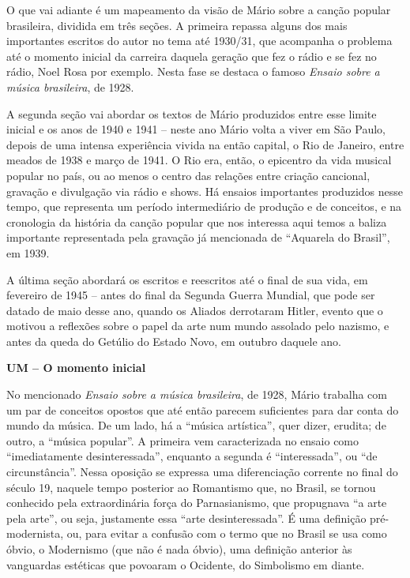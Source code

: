 O que vai adiante é um mapeamento da visão de Mário sobre a canção
popular brasileira, dividida em três seções. A primeira repassa alguns
dos mais importantes escritos do autor no tema até 1930/31, que
acompanha o problema até o momento inicial da carreira daquela geração
que fez o rádio e se fez no rádio, Noel Rosa por exemplo. Nesta fase se
destaca o famoso \emph{Ensaio sobre a música brasileira}, de 1928.

A segunda seção vai abordar os textos de Mário produzidos entre esse
limite inicial e os anos de 1940 e 1941 -- neste ano Mário volta a viver
em São Paulo, depois de uma intensa experiência vivida na então capital,
o Rio de Janeiro, entre meados de 1938 e março de 1941. O Rio era,
então, o epicentro da vida musical popular no país, ou ao menos o centro
das relações entre criação cancional, gravação e divulgação via rádio e
shows. Há ensaios importantes produzidos nesse tempo, que representa um
período intermediário de produção e de conceitos, e na cronologia da
história da canção popular que nos interessa aqui temos a baliza
importante representada pela gravação já mencionada de ``Aquarela do
Brasil'', em 1939.

A última seção abordará os escritos e reescritos até o final de sua
vida, em fevereiro de 1945 -- antes do final da Segunda Guerra Mundial,
que pode ser datado de maio desse ano, quando os Aliados derrotaram
Hitler, evento que o motivou a reflexões sobre o papel da arte num mundo
assolado pelo nazismo, e antes da queda do Getúlio do Estado Novo, em
outubro daquele ano.

\textbf{UM -- O momento inicial}

No mencionado \emph{Ensaio sobre a música brasileira}, de 1928, Mário
trabalha com um par de conceitos opostos que até então parecem
suficientes para dar conta do mundo da música. De um lado, há a ``música
artística'', quer dizer, erudita; de outro, a ``música popular''. A
primeira vem caracterizada no ensaio como ``imediatamente
desinteressada'', enquanto a segunda é ``interessada'', ou ``de
circunstância''. Nessa oposição se expressa uma diferenciação corrente
no final do século 19, naquele tempo posterior ao Romantismo que, no
Brasil, se tornou conhecido pela extraordinária força do Parnasianismo,
que propugnava ``a arte pela arte'', ou seja, justamente essa ``arte
desinteressada''. É uma definição pré-modernista, ou, para evitar a
confusão com o termo que no Brasil se usa como óbvio, o Modernismo (que
não é nada óbvio), uma definição anterior às vanguardas estéticas que
povoaram o Ocidente, do Simbolismo em diante.


